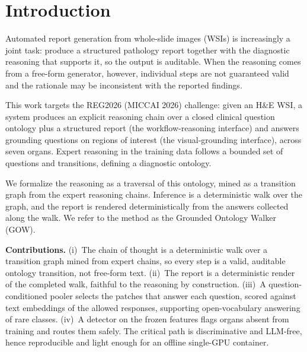 \documentclass[runningheads]{llncs}
\begin{document}
\section{Introduction}
\label{sec:intro}
Automated report generation from whole-slide images (WSIs) is increasingly a joint task: produce a structured
pathology report together with the diagnostic reasoning that supports it, so the output is auditable. When the
reasoning comes from a free-form generator, however, individual steps are not guaranteed valid and the rationale
may be inconsistent with the reported findings.

This work targets the REG2026 (MICCAI 2026) challenge: given an H\&E WSI, a system produces an explicit reasoning
chain over a closed clinical question ontology plus a structured report (the workflow-reasoning interface) and
answers grounding questions on regions of interest (the visual-grounding interface), across seven organs. Expert
reasoning in the training data follows a bounded set of questions and transitions, defining a diagnostic ontology.

We formalize the reasoning as a traversal of this ontology, mined as a transition graph from the expert
reasoning chains. Inference is a deterministic walk over the graph, and the report is rendered deterministically
from the answers collected along the walk. We refer to the method as the Grounded Ontology Walker (GOW).

\noindent\textbf{Contributions.} (i)~The chain of thought is a deterministic walk over a transition graph mined
from expert chains, so every step is a valid, auditable ontology transition, not free-form text. (ii)~The report
is a deterministic render of the completed walk, faithful to the reasoning by construction. (iii)~A
question-conditioned pooler selects the patches that answer each question, scored against text embeddings of the
allowed responses, supporting open-vocabulary answering of rare classes. (iv)~A detector on the frozen features
flags organs absent from training and routes them safely. The critical path is discriminative and LLM-free,
hence reproducible and light enough for an offline single-GPU container.
\end{document}
